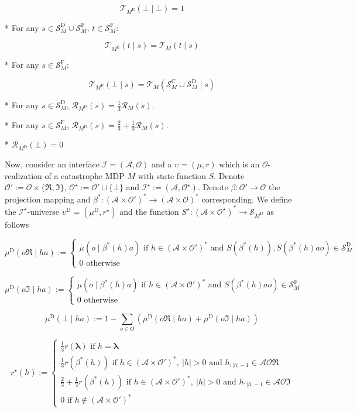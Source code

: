 \documentclass[a4paper]{article}
\newcommand{\AP}[1]{\left(#1\right)}
\newcommand{\Estr}{\boldsymbol{\lambda}}
\newcommand{\Abs}[1]{\lvert #1 \rvert}
\newcommand{\Ob}{\mathcal{O}}
\newcommand{\A}{\mathcal{A}}
\newcommand{\St}{\mathcal{S}}
\newcommand{\T}{\mathcal{T}}
\newcommand{\R}{\mathcal{R}}
\newcommand{\In}{\mathcal{I}}
\newcommand{\RMC}{\mathrm{C}}
\newcommand{\RMD}{\mathrm{D}}
\newcommand{\RME}{\mathrm{E}}
\newcommand{\RMF}{\mathrm{F}}
\newcommand{\SF}{\St^{\RMF}}
\newcommand{\SD}{\St^{\RMD}}
\newcommand{\SC}{\St^{\RMC}}
\newcommand{\MD}{M^{\RMD}}
\newcommand{\ME}{M^{\RME}}
\newcommand{\UD}{\upsilon^{\RMD}}
\begin{document}
$$\T_{\ME}(\bot \mid \bot) = 1$$

* For any $s \in \SD_M \cup \SF_M$, $t \in \SF_M$:

$$\T_{\ME}(t \mid s) = \T_M(t \mid s)$$

* For any $s \in \SF_M$:

$$\T_{\ME}(\bot \mid s) = \T_M(\SC_M \cup \SD_M \mid s)$$

* For any $s \in \SD_M$, $\R_{\MD}(s) = \frac{1}{3}\R_M(s)$.

* For any $s \in \SF_M$, $\R_{\MD}(s) = \frac{2}{3} + \frac{1}{3}\R_M(s)$.

* $\R_{\MD}(\bot) = 0$

Now, consider an interface $\In=(\A,\Ob)$ and a $\upsilon=(\mu,r)$ which is an $\Ob$-realization of a catastrophe MDP $M$ with state function $S$. Denote $\Ob':=\Ob\times\{\Re,\Im\}$, $\Ob^\star:=\Ob' \sqcup \{\bot\}$ and $\In^\star:=(\A,\Ob^\star)$. Denote $\beta: \Ob' \rightarrow \Ob$ the projection mapping and $\beta^*: \AP{\A \times \Ob'}^* \rightarrow \AP{\A \times \Ob}^*$ corresponding. We define the $\In^\star$-universe $\UD=(\mu^\RMD,r^\star)$ and the function $S^\star: \AP{\A \times \Ob^\star}^* \rightarrow \St_{\MD}$ as follows

$$\mu^\RMD(o\Re \mid ha) := \begin{cases} \mu\AP{o \mid \beta^*(h)a} \text{ if } h\in\AP{\A \times \Ob'}^* \text{ and } S\AP{\beta^*(h)},S\AP{\beta^*(h)ao}\in\SD_M \\ 0 \text{ otherwise} \end{cases}$$

$$\mu^\RMD(o\Im \mid ha) := \begin{cases} \mu\AP{o \mid \beta^*(h)a} \text{ if } h\in\AP{\A \times \Ob'}^* \text{ and } S\AP{\beta^*(h)ao}\in\SF_M \\ 0 \text{ otherwise} \end{cases}$$

$$\mu^\RMD(\bot \mid ha) := 1 - \sum_{o \in O} \AP{\mu^\RMD(o\Re \mid ha) + \mu^\RMD(o\Im \mid ha)}$$

$$r^\star(h):=\begin{cases} \frac{1}{3}r(\Estr) \text{ if } h = \Estr \\ \frac{1}{3}r\AP{\beta^*(h)} \text{ if } h\in\AP{\A \times \Ob'}^*,\ \Abs{h}>0 \text{ and } h_{:\Abs{h}-1}\in\A\Ob\Re \\ \frac{2}{3} + \frac{1}{3}r\AP{\beta^*(h)} \text{ if } h\in\AP{\A \times \Ob'}^*,\ \Abs{h}>0 \text{ and } h_{:\Abs{h}-1}\in\A\Ob\Im \\ 0 \text{ if } h\not\in\AP{\A \times \Ob'}^* \end{cases}$$
\end{document}
